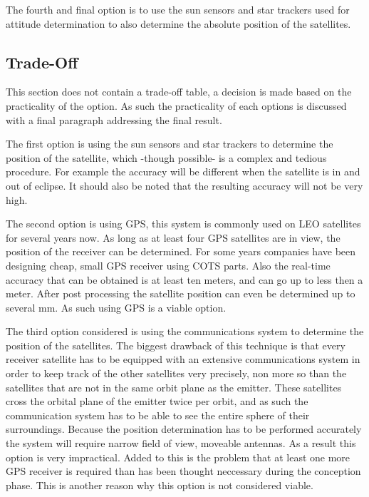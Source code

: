 The fourth and final option is to use the sun sensors and star trackers used for attitude determination to also determine the absolute position of the satellites.

\subsection{Trade-Off}
\label{navi2}
This section does not contain a trade-off table, a decision is made based on the practicality of the option. As such the practicality of each options is discussed with a final paragraph addressing the final result.

The first option is using the sun sensors and star trackers to determine the position of the satellite, which -though possible- is a complex and tedious procedure. For example the accuracy will be different when the satellite is in and out of eclipse. It should also be noted that the resulting accuracy will not be very high.

The second option is using \acs{GPS}, this system is commonly used on \acs{LEO} satellites for several years now. As long as at least four \acs{GPS} satellites are in view, the position of the receiver can be determined. For some years companies have been designing cheap, small GPS receiver using \acs{COTS} parts. Also the real-time accuracy that can be obtained is at least ten meters, and can go up to less then a meter. After post processing the satellite position can even be determined up to several mm. As such using \acs{GPS} is a viable option.

The third option considered is using the communications system to determine the position of the satellites. The biggest drawback of this technique is that every receiver satellite has to be equipped with an extensive communications system in order to keep track of the other satellites very precisely, non more so than the satellites that are not in the same orbit plane as the emitter. These satellites cross the orbital plane of the emitter twice per orbit, and as such the communication system has to be able to see the entire sphere of their surroundings. Because the position determination has to be performed accurately the system will require narrow field of view, moveable antennas. As a result this option is very impractical. Added to this is the problem that at least one more \acs{GPS} receiver is required than has been thought neccessary during the conception phase. This is another reason why this option is not considered viable.

